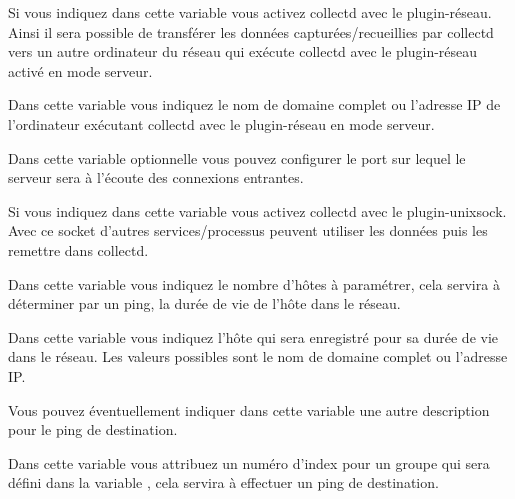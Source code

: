 \begin{description}

  Si vous indiquez  dans cette variable vous activez collectd avec le
  plugin-réseau. Ainsi il sera possible de transférer les données capturées/recueillies
  par collectd vers un autre ordinateur du réseau qui exécute collectd avec le
  plugin-réseau activé en mode serveur.


  Dans cette variable vous indiquez le nom de domaine complet ou l'adresse IP
  de l'ordinateur exécutant collectd avec le plugin-réseau en mode serveur.


  Dans cette variable optionnelle vous pouvez configurer le port sur lequel
  le serveur sera à l'écoute des connexions entrantes.


  Si vous indiquez  dans cette variable vous activez collectd avec
  le plugin-unixsock. Avec ce socket d'autres services/processus peuvent
  utiliser les données puis les remettre dans collectd.


  Dans cette variable vous indiquez le nombre d'hôtes à paramétrer, cela servira
  à déterminer par un ping, la durée de vie de l'hôte dans le réseau.


  Dans cette variable vous indiquez l'hôte qui sera enregistré pour sa durée de vie
  dans le réseau. Les valeurs possibles sont le nom de domaine complet
  ou l'adresse IP.


  Vous pouvez éventuellement indiquer dans cette variable une autre description pour
  le ping de destination.


  Dans cette variable vous attribuez un numéro d'index pour un groupe qui sera
  défini dans la variable , cela servira à
  effectuer un ping de destination.



\end{description}
